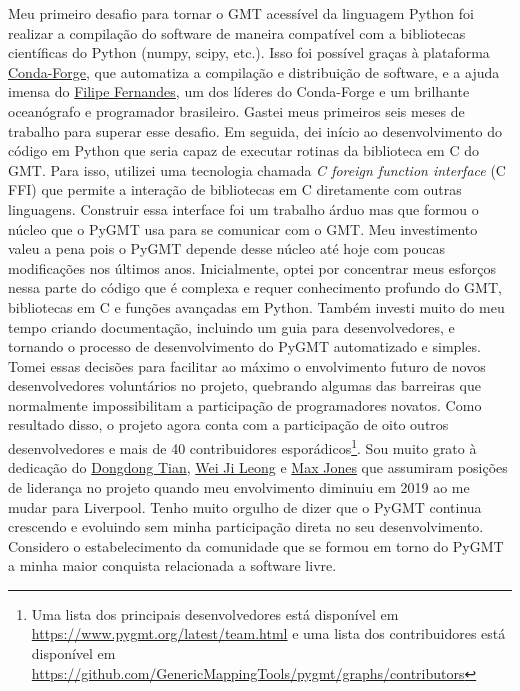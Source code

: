 \documentclass[10pt,a4paper,oneside]{book}
\begin{document}
Meu primeiro desafio para tornar o GMT acessível da linguagem Python foi
realizar a compilação do software de maneira compatível com a bibliotecas
científicas do Python (numpy, scipy, etc.).
Isso foi possível graças à plataforma
\href{https://conda-forge.org/}{Conda-Forge}, que automatiza a compilação e
distribuição de software, e a ajuda imensa do
\href{https://github.com/ocefpaf}{Filipe Fernandes}, um dos líderes do
Conda-Forge e um brilhante oceanógrafo e programador brasileiro.
Gastei meus primeiros seis meses de trabalho para superar esse desafio.
Em seguida, dei início ao desenvolvimento do código em Python que seria capaz
de executar rotinas da biblioteca em C do GMT.
Para isso, utilizei uma tecnologia chamada \textit{C foreign function
interface} (C FFI) que permite a interação de bibliotecas em C diretamente com
outras linguagens.
Construir essa interface foi um trabalho árduo mas que formou o núcleo que o
PyGMT usa para se comunicar com o GMT.
Meu investimento valeu a pena pois o PyGMT depende desse núcleo até hoje com
poucas modificações nos últimos anos.
Inicialmente, optei por concentrar meus esforços nessa parte do código que é
complexa e requer conhecimento profundo do GMT, bibliotecas em C e funções
avançadas em Python.
Também investi muito do meu tempo criando documentação, incluindo um guia para
desenvolvedores, e tornando o processo de desenvolvimento do PyGMT
automatizado e simples.
Tomei essas decisões para facilitar ao máximo o envolvimento futuro de novos
desenvolvedores voluntários no projeto, quebrando algumas das barreiras que
normalmente impossibilitam a participação de programadores novatos.
Como resultado disso, o projeto agora conta com a participação de oito outros
desenvolvedores e mais de 40 contribuidores esporádicos\footnote{Uma lista dos
principais desenvolvedores está disponível em \url{https://www.pygmt.org/latest/team.html}
e uma lista dos contribuidores está disponível em \url{https://github.com/GenericMappingTools/pygmt/graphs/contributors}}.
Sou muito grato à dedicação do
\href{https://github.com/seisman}{Dongdong Tian},
\href{https://weiji14.github.io/}{Wei Ji Leong} e
\href{https://github.com/maxrjones}{Max Jones}
que assumiram posições de liderança no projeto quando meu envolvimento diminuiu
em 2019 ao me mudar para Liverpool.
Tenho muito orgulho de dizer que o PyGMT continua crescendo e evoluindo sem
minha participação direta no seu desenvolvimento.
Considero o estabelecimento da comunidade que se formou em torno do PyGMT a
minha maior conquista relacionada a software livre.
\end{document}
